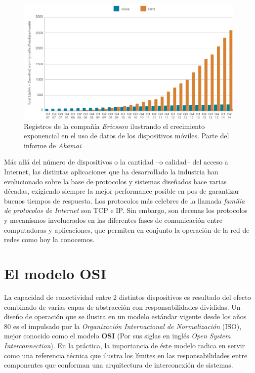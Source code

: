 \begin{figure}[!h]
	\centering
	\includegraphics[scale=0.5]{imagenes/conexiones_moviles}
	\caption{Registros de la compañía \emph{Ericsson} ilustrando el crecimiento exponencial en el uso de datos de los dispositivos móviles. Parte del informe de \emph{Akamai} \cite{report:akamai}}
	\label{fig:akamai_stats}
\end{figure}

Más allá del número de dispositivos o la cantidad --o calidad-- del acceso a Internet, las distintas aplicaciones que ha desarrollado la industria han evolucionado sobre la base de protocolos y sistemas diseñados hace varias décadas, exigiendo siempre la mejor performance posible en pos de garantizar buenos tiempos de respuesta. Los protocolos más celebres de la llamada \emph{familia de protocolos de Internet} son TCP e IP. Sin embargo, son decenas los protocolos y mecanísmos involucrados en las diferentes fases de comunicación entre computadoras y aplicaciones, que permiten en conjunto la operación de la red de redes como hoy la conocemos.

\section{El modelo OSI}
La capacidad de conectividad entre 2 distintos dispositivos es resultado del efecto combinado de varias capas de abstracción con responsabilidades divididas. Un diseño de operación que se ilustra en un modelo estándar vigente desde los años 80 es el impulsado por la \emph{Organización Internacional de Normalización} (ISO), mejor conocido como el modelo \textbf{OSI} (Por sus siglas en inglés \emph{Open System Interconnection}). En la práctica, la importancia de éste modelo radica en servir como una referencia técnica que ilustra los límites en las responsabilidades entre componentes que conforman una arquitectura de interconexión de sistemas.

